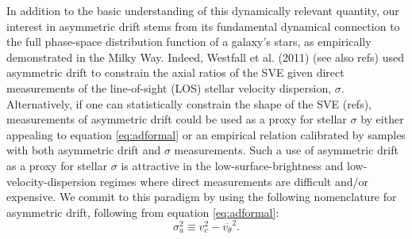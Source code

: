 \documentclass[apj,iop,revtex4,numberedappendix]{emulateapj}
\begin{document}
In addition to the basic understanding of this dynamically relevant
quantity, our interest in asymmetric drift stems from its fundamental
dynamical connection to the full phase-space distribution function of a
galaxy's stars, as empirically demonstrated in the Milky Way.  Indeed,
Westfall et al. (2011) (see also refs) used asymmetric drift to
constrain the axial ratios of the SVE given direct measurements of the
line-of-sight (LOS) stellar velocity dispersion, $\sigma$.
Alternatively, if one can statistically constrain the shape of the SVE
(refs), measurements of asymmetric drift could be used as a proxy for
stellar $\sigma$ by either appealing to equation \ref{eq:adformal} or an
empirical relation calibrated by samples with both asymmetric drift and
$\sigma$ measurements.  Such a use of asymmetric drift as a proxy for
stellar $\sigma$ is attractive in the low-surface-brightness and
low-velocity-dispersion regimes where direct measurements are difficult
and/or expensive.  We commit to this paradigm by using the following
nomenclature for asymmetric drift, following from equation
\ref{eq:adformal}:
%
\begin{equation}
%
\sigma_a^2 \equiv v_c^2 - \overline{v_\theta}^2.
%
\label{eq:addef}
%
\end{equation}
\end{document}
